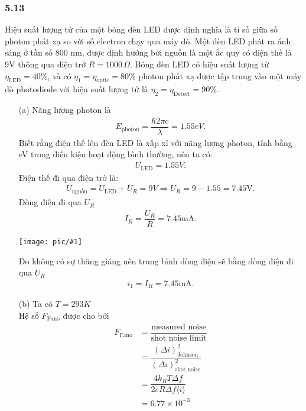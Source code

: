 \documentclass{article}
\newcommand{\image}[1]{
	\begin{center}
		\texttt{[image: pic/\#1]}
	\end{center}
}
\newcommand{\f}[2]{\dfrac{#1}{#2}}
\begin{document}
\subsubsection*{5.13}
Hiệu suất lượng tử của một bóng đèn LED được định nghĩa là tỉ số giữa số photon phát xạ so với số electron chạy qua máy dò. Một đèn LED phát ra ánh sáng ở tần số 800 nm, được định hướng bởi nguồn là một ắc quy có điện thế là 9V thông qua điện trở $R = 1000 \, \Omega$. Bóng đèn LED có hiệu suất lượng tử $\eta_{\text{LED}} = 40\%$, và có $\eta_{1} = \eta_{\text{optic}} = 80\%$ photon phát xạ được tập trung vào một máy dò photodiode với hiệu suất lượng tử là $\eta_{2} =\eta_{\text{Detect}} = 90\%$.
\begin{enumerate}
	\item[(a)] Năng lượng photon là
	      \begin{align*}
		      E_{\text{photon}} = \f{\hbar 2 \pi c}{\lambda} = 1.55eV.
	      \end{align*}
	      Biết rằng điện thế lên đèn LED là xấp xỉ với năng lượng photon, tính bằng eV trong điều kiện hoạt động bình thường, nên ta có:
	      \begin{align*}
		      U_{\text{LED}} = 1.55 V.
	      \end{align*}
	      Điện thế đi qua điện trở là:
	      \begin{align*}
		      U_{\text{nguồn}} = U_{\text{LED}} + U_{R} = 9 V \Rightarrow U_{R} = 9 - 1.55 = 7.45 \text{V}.
	      \end{align*}
	      Dòng điện đi qua $U_{R}$
	      \begin{align*}
		      I_{R} = \f{U_{R}}{R} = 7.45 \text{mA}.
	      \end{align*}
	      \image{circuit.png}
	      Do không có sự thăng giáng nên trung bình dòng điện sẽ bằng dòng điện đi qua $U_{R}$
	      \begin{align*}
		      i_{1} = I_{R} = 7.45 \text{mA}.
	      \end{align*}
	\item[(b)] Ta có $T = 293 K$\\
	Hệ số $F_{\text{Fano}}$ được cho bởi
	\begin{align*}
		F_{\text{Fano}} 
		&= \f{\text{measured noise}}{\text{shot noise limit}} \\
		&= \f{(\Delta i)_{\text{Johnson}}^2}{(\Delta i)_{\text{shot noise}}^2} \\
		&= \f{4 k_B T \Delta f}{2e R \Delta f \langle i \rangle} \\
		&= 6.77 \times 10^{-3}
	\end{align*}

\end{enumerate}
\end{document}
